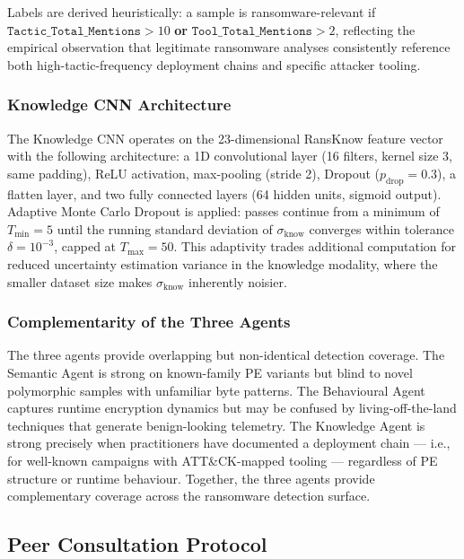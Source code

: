 Labels are derived heuristically: a sample is ransomware-relevant if $\texttt{Tactic\_Total\_Mentions} > 10$ \textbf{or} $\texttt{Tool\_Total\_Mentions} > 2$, reflecting the empirical observation that legitimate ransomware analyses consistently reference both high-tactic-frequency deployment chains and specific attacker tooling.

\subsubsection{Knowledge CNN Architecture}

The Knowledge CNN operates on the 23-dimensional RansKnow feature vector with the following architecture: a 1D convolutional layer (16 filters, kernel size 3, same padding), ReLU activation, max-pooling (stride 2), Dropout ($p_\text{drop} = 0.3$), a flatten layer, and two fully connected layers (64 hidden units, sigmoid output). Adaptive Monte Carlo Dropout is applied: passes continue from a minimum of $T_\text{min} = 5$ until the running standard deviation of $\sigma_\text{know}$ converges within tolerance $\delta = 10^{-3}$, capped at $T_\text{max} = 50$. This adaptivity trades additional computation for reduced uncertainty estimation variance in the knowledge modality, where the smaller dataset size makes $\sigma_\text{know}$ inherently noisier.

\subsubsection{Complementarity of the Three Agents}

The three agents provide overlapping but non-identical detection coverage. The Semantic Agent is strong on known-family PE variants but blind to novel polymorphic samples with unfamiliar byte patterns. The Behavioural Agent captures runtime encryption dynamics but may be confused by living-off-the-land techniques that generate benign-looking telemetry. The Knowledge Agent is strong precisely when practitioners have documented a deployment chain — i.e., for well-known campaigns with ATT\&CK-mapped tooling — regardless of PE structure or runtime behaviour. Together, the three agents provide complementary coverage across the ransomware detection surface.

\subsection{Peer Consultation Protocol}
\label{sec:tifs_consultation}

